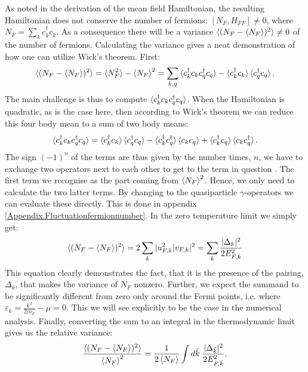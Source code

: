 As noted in the derivation of the mean field Hamiltonian, the resulting Hamiltonian does not conserve the number of fermions: $[N_F, H_{FF}] \neq 0 $, where $N_F = \sum_k c^\dagger_k c_k$. As a consequence there will be a variance $\braket{(N_F-\braket{N_F})^2} \neq 0$ of the number of fermions. Calculating the variance gives a neat demonstration of how one can utilize Wick's theorem. First:
\begin{equation}
\braket{(N_F-{\braket{N_F}})^2} = \braket{N_F^2} - \braket{N_F}^2 = \sum_{k,q} \braket{c^\dagger_kc_kc^\dagger_qc_q} - \braket{c^\dagger_kc_k}\braket{c^\dagger_qc_q}. \nonumber
\end{equation} 
The main challenge is thus to compute $\braket{c^\dagger_kc_kc^\dagger_qc_q}$. When the Hamiltonian is quadratic, as is the case here, then according to Wick's theorem we can reduce this four body mean to a sum of two body means:
\begin{equation}
\braket{c^\dagger_kc_kc^\dagger_qc_q} = \braket{c^\dagger_kc_k}\braket{c^\dagger_qc_q} - \braket{c^\dagger_kc^\dagger_q}\braket{c_kc_q} + \braket{c^\dagger_kc_q}\braket{c_kc^\dagger_q}. \nonumber
\end{equation}
The sign $(-1)^{n}$ of the terms are thus given by the number times, $n$, we have to exchange two operators next to each other to get to the term in question \cite[pp. 170-174]{BruusFlensberg}. The first term we recognise as the part coming from $\braket{N_F}^2$. Hence, we only need to calculate the two latter terms. By changing to the quasiparticle $\gamma$-operators we can evaluate these directly. This is done in appendix \ref{Appendix.Fluctuationfermionnumber}. In the zero temperature limit we simply get:
\begin{equation}
\braket{(N_F-{\braket{N_F}})^2} = 2\sum_k |u_{F,k}^2|v_{F,k}|^2 = \sum_k \frac{|\Delta_k|^2}{2E^2_{F,k}}
\end{equation}
This equation clearly demonstrates the fact, that it is the presence of the pairing, $\Delta_k$, that makes the variance of $N_F$ nonzero. Further, we expect the summand to be significantly different from zero only around the Fermi points, i.e. where $\varepsilon_k = \frac{k^2}{2m_F} - \mu = 0$. This we will see explicitly to be the case in the numerical analysis. Finally, converting the sum to an integral in the thermodynamic limit gives us the relative variance:
\begin{equation}
\frac{\braket{(N_F-\braket{N_F})^2}}{\braket{N_F}^2} = \frac{1}{2\braket{N_F}}\int d\tilde{k} \; \frac{|\Delta_{\tilde{k}}|^2}{2E^2_{F,\tilde{k}}}. \nonumber
\end{equation}
